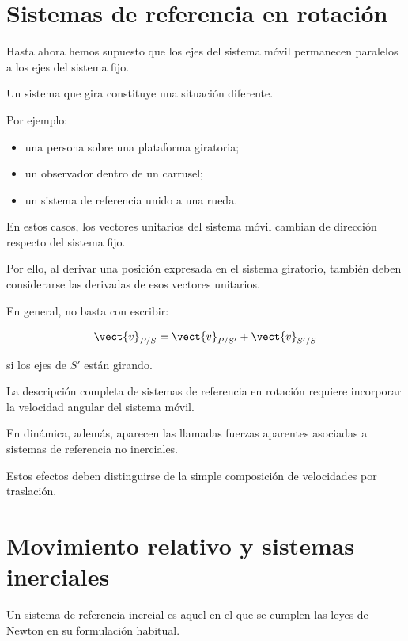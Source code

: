 \section{Sistemas de referencia en rotación}

Hasta ahora hemos supuesto que los ejes del sistema
móvil permanecen paralelos a los ejes del sistema fijo.

Un sistema que gira constituye una situación diferente.

Por ejemplo:

\begin{itemize}
    \item una persona sobre una plataforma giratoria;
    \item un observador dentro de un carrusel;
    \item un sistema de referencia unido a una rueda.
\end{itemize}

En estos casos, los vectores unitarios del sistema
móvil cambian de dirección respecto del sistema fijo.

Por ello, al derivar una posición expresada
en el sistema giratorio, también deben considerarse
las derivadas de esos vectores unitarios.

En general, no basta con escribir:

\[
\vect{v}_{P/S}
=
\vect{v}_{P/S'}
+
\vect{v}_{S'/S}
\]

si los ejes de \(S'\) están girando.

\begin{observacion}

La descripción completa de sistemas de referencia
en rotación requiere incorporar la velocidad angular
del sistema móvil.

En dinámica, además, aparecen las llamadas
fuerzas aparentes asociadas a sistemas
de referencia no inerciales.

Estos efectos deben distinguirse de la simple
composición de velocidades por traslación.

\end{observacion}


\section{Movimiento relativo y sistemas inerciales}

Un sistema de referencia inercial es aquel
en el que se cumplen las leyes de Newton
en su formulación habitual.

